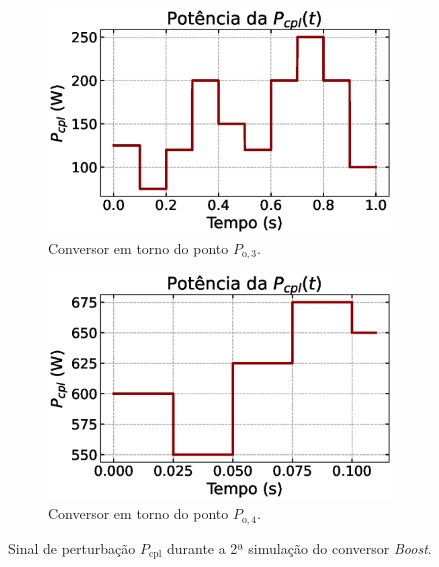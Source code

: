 \begin{figure}[ht]
  \centering
  \captionsetup{justification=centering}
  \begin{subfigure}{.5\textwidth}
    \centering
    \captionsetup{justification=centering}
    \includegraphics[width=1.\textwidth]{figuras/boost/sim2/op1/power_cpl_variation.eps}
    \caption{Conversor em torno do ponto $P_{\mathrm{o}, 3}$.}
    \label{fig:boost_power_cpl_variation_1}
  \end{subfigure}%
  \begin{subfigure}{.5\textwidth}
    \centering
    \captionsetup{justification=centering}
    \includegraphics[width=1.\textwidth]{figuras/boost/sim2/op2/power_cpl_variation.eps}
    \caption{Conversor em torno do ponto $P_{\mathrm{o}, 4}$.}
    \label{fig:boost_power_cpl_variation_2}
  \end{subfigure}
  \caption{Sinal de perturbação $P_{\mathrm{cpl}}$ durante a 2ª simulação do conversor \textit{Boost}.}
  \label{fig:boost_power_cpl_variation}
\end{figure}


